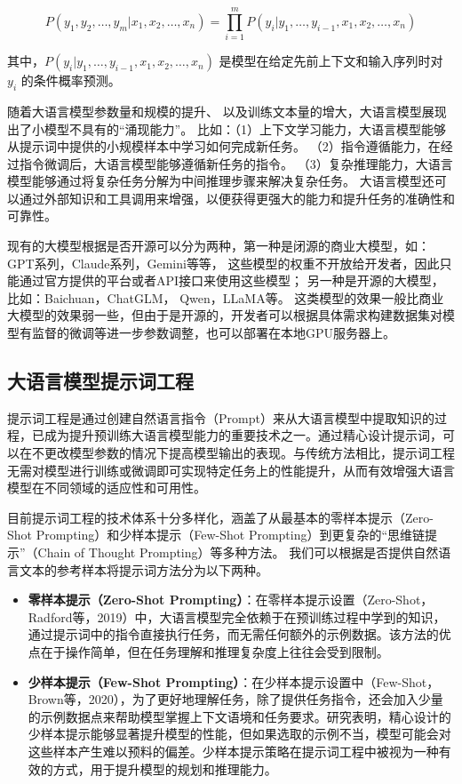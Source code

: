 \[
P(y_1, y_2, \dots, y_m | x_1, x_2, \dots, x_n) = \prod_{i=1}^{m} P(y_i | y_1, \dots, y_{i-1}, x_1, x_2, \dots, x_n)
\]

其中，\( P(y_i | y_1, \dots, y_{i-1}, x_1, x_2, \dots, x_n) \) 是模型在给定先前上下文和输入序列时对 \( y_i \) 的条件概率预测。

随着大语言模型参数量和规模的提升、
以及训练文本量的增大，大语言模型展现出了小模型不具有的“涌现能力”。
比如：（1）上下文学习能力，大语言模型能够从提示词中提供的小规模样本中学习如何完成新任务。
（2）指令遵循能力，在经过指令微调后，大语言模型能够遵循新任务的指令。
（3）复杂推理能力，大语言模型能够通过将复杂任务分解为中间推理步骤来解决复杂任务。
大语言模型还可以通过外部知识和工具调用来增强，以便获得更强大的能力和提升任务的准确性和可靠性。

现有的大模型根据是否开源可以分为两种，第一种是闭源的商业大模型，如：GPT系列\cite{achiam2023gpt, OpenAI2023}，Claude系列\cite{anthropic2023claude3}，Gemini\cite{team2023gemini, team2024gemini}等等，
这些模型的权重不开放给开发者，因此只能通过官方提供的平台或者API接口来使用这些模型；
另一种是开源的大模型，比如：Baichuan\cite{Yang2023}，ChatGLM\cite{Zeng2023}，
Qwen\cite{yang2024qwen2}，LLaMA\cite{Touvron2023}等。
这类模型的效果一般比商业大模型的效果弱一些，但由于是开源的，开发者可以根据具体需求构建数据集对模型有监督的微调等进一步参数调整，也可以部署在本地GPU服务器上。

\subsection{大语言模型提示词工程}

提示词工程是通过创建自然语言指令（Prompt）来从大语言模型中提取知识的过程，已成为提升预训练大语言模型能力的重要技术之一。通过精心设计提示词，可以在不更改模型参数的情况下提高模型输出的表现。与传统方法相比，提示词工程无需对模型进行训练或微调即可实现特定任务上的性能提升，从而有效增强大语言模型在不同领域的适应性和可用性。

目前提示词工程的技术体系十分多样化，涵盖了从最基本的零样本提示（Zero-Shot Prompting）和少样本提示（Few-Shot Prompting）到更复杂的“思维链提示”（Chain of Thought Prompting）等多种方法。
我们可以根据是否提供自然语言文本的参考样本将提示词方法分为以下两种。

\begin{itemize}
    \item \textbf{零样本提示（Zero-Shot Prompting）}：在零样本提示设置（Zero-Shot，Radford等，2019）中，大语言模型完全依赖于在预训练过程中学到的知识，通过提示词中的指令直接执行任务，而无需任何额外的示例数据。该方法的优点在于操作简单，但在任务理解和推理复杂度上往往会受到限制。
    \item \textbf{少样本提示（Few-Shot Prompting）}：在少样本提示设置中（Few-Shot，Brown等，2020），为了更好地理解任务，除了提供任务指令，还会加入少量的示例数据点来帮助模型掌握上下文语境和任务要求。研究表明，精心设计的少样本提示能够显著提升模型的性能，但如果选取的示例不当，模型可能会对这些样本产生难以预料的偏差。少样本提示策略在提示词工程中被视为一种有效的方式，用于提升模型的规划和推理能力。
\end{itemize}

